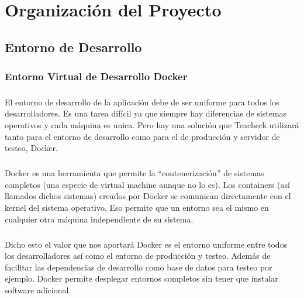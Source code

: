 \chapter{Organización del Proyecto}

\paragraph{}

\section{Entorno de Desarrollo}
\paragraph{}

\subsection{Entorno Virtual de Desarrollo Docker}
\paragraph{}
El entorno de desarrollo de la aplicación debe de ser uniforme para todos los desarrolladores. Es una tarea difícil ya que siempre hay diferencias de sistemas operativos y cada máquina es unica. Pero hay una solución que Teacheck utilizará tanto para el entorno de desarrollo como para el de producción y servidor de testeo, Docker.

\paragraph{}
Docker es una herramienta que permite la “contenerización” de sistemas completos (una especie de virtual machine aunque no lo es). Los containers (así llamados dichos sistemas) creados por Docker se comunican directamente con el kernel del sistema operativo. Eso permite que un entorno sea el mismo en cualquier otra máquina independiente de su sistema.

\paragraph{}
Dicho esto el valor que nos aportará Docker es el entorno uniforme entre todos los desarrolladores así como el entorno de producción y testeo. Además de facilitar las dependencias de desarrollo como base de datos para testeo por ejemplo. Docker permite desplegar entornos completos sin tener que instalar software adicional.

